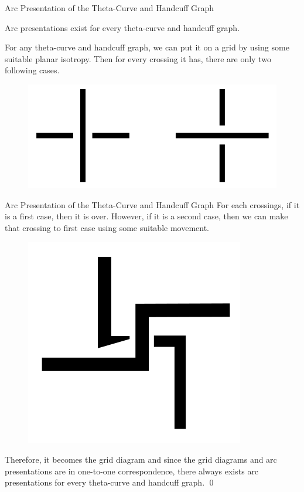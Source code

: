 \begin{frame}{Arc Presentation of the Theta-Curve and Handcuff Graph}
	\begin{thm}
    Arc presentations exist for every theta-curve and handcuff graph. 
	\end{thm}
	\mypf
    For any theta-curve and handcuff graph, we can put it on a grid by using some suitable planar isotropy.
    Then for every crossing it has, there are only two following cases.
    \begin{figure}
        \centerline{\includegraphics[width=0.25\linewidth]{figure/crossings.png}}
    \end{figure}
\end{frame}

\begin{frame}{Arc Presentation of the Theta-Curve and Handcuff Graph}
	\mypf
	For each crossings, if it is a first case, then it is over.
    However, if it is a second case, then we can make that crossing to first case using some suitable movement.
    \begin{figure}
        \centerline{\includegraphics[width=0.125\linewidth]{figure/move crossing.png}}
    \end{figure}
    Therefore, it becomes the grid diagram and since the grid diagrams and arc presentations are in one-to-one correspondence, there always exists arc presentations for every theta-curve and handcuff graph.
	\hfill\qed
\end{frame}

